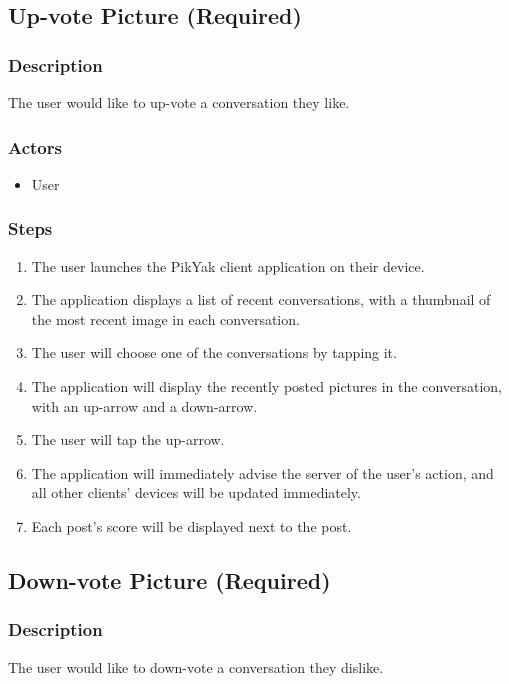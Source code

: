 \documentclass[11pt]{scrartcl}
\begin{document}
    \subsection{Up-vote Picture (Required)}
        \subsubsection{Description}
            The user would like to up-vote a conversation they like.
        \subsubsection{Actors}
            \begin{itemize}
                \item User
            \end{itemize}
        \subsubsection{Steps}
            \begin{enumerate}
                \item The user launches the PikYak client application on their device.
                \item The application displays a list of recent conversations, with a thumbnail of the most recent image in each conversation.
                \item The user will choose one of the conversations by tapping it.
                \item The application will display the recently posted pictures in the conversation, with an up-arrow and a down-arrow.
                \item The user will tap the up-arrow.
                \item The application will immediately advise the server of the user's action, and all other clients' devices will be updated immediately.
                \item Each post's score will be displayed next to the post.
            \end{enumerate}

    \subsection{Down-vote Picture (Required)}
        \subsubsection{Description}
            The user would like to down-vote a conversation they dislike.
\end{document}
